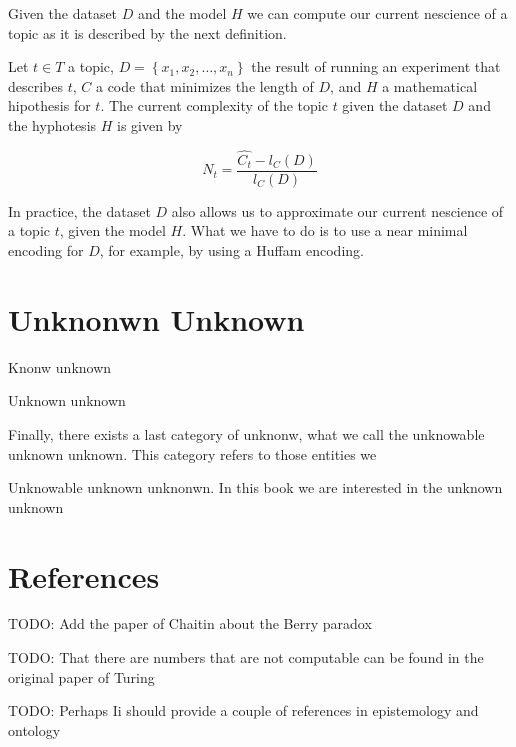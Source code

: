 Given the dataset $D$ and the model $H$ we can compute our current
nescience of a topic as it is described by the next definition.

\begin{definition}
Let $t\in T$ a topic, $D=\left\{ x_{1},x_{2},\ldots,x_{n}\right\} $
the result of running an experiment that describes $t$, $C$ a code
that minimizes the length of $D$, and $H$ a mathematical hipothesis
for $t$. The current complexity of the topic $t$ given the dataset
$D$ and the hyphotesis $H$ is given by

\[
N_{t}=\frac{\hat{C_{t}}-l_{C}(D)}{l_{C}(D)}
\]

\end{definition}

In practice, the dataset $D$ also allows us to approximate our current
nescience of a topic $t$, given the model $H$. What we have to do
is to use a near minimal encoding for $D$, for example, by using
a Huffam encoding.


%
%

\section{Unknonwn Unknown}

Knonw unknown

Unknown unknown

Finally, there exists a last category of unknonw, what we call the unknowable unknown unknown. This category refers to those entities we

Unknowable unknown unknonwn. In this book we are interested in the unknown unknown

%
%

\section*{References}

{\color{red} TODO: Add the paper of Chaitin about the Berry paradox}

{\color{red} TODO: That there are numbers that are not computable can be found in the original paper of Turing}

{\color{red} TODO: Perhaps Ii should provide a couple of references in epistemology and ontology}
